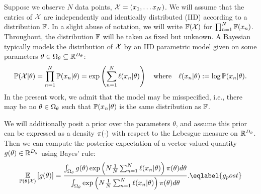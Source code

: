 Suppose we observe $N$ data points, ${\mathcal{X}} = (x_1, \ldots x_N)$.  We will
assume that the entries of ${\mathcal{X}}$ are independently and identically distributed
(IID) according to a distribution $\mathbb{F}$.  In a slight abuse of notation, we
will write $\mathbb{F}({\mathcal{X}})$ for $\prod_{n=1}^N \mathbb{F}(x_n)$.  Throughout, the
distribution $\mathbb{F}$ will be taken as fixed but unknown.  A Bayesian typically
models the distribution of ${\mathcal{X}}$ by an IID parametric model
given on some parameters $\theta \in \Omega_\theta \subseteq \mathbb{R}^{D_\theta}$:
%
$$
\mathbb{P}({\mathcal{X}} \vert \theta) = \prod_{n=1}^N \mathbb{P}(x_n \vert \theta) = 
    \exp\left(\sum_{n=1}^N \ell(x_n \vert \theta) \right)
\quad\textrm{where}\quad
\ell(x_n \vert \theta) := \log \mathbb{P}(x_n \vert \theta).
$$
%
In the present work, we admit that the model may be misspecified, i.e., there may be no $\theta
\in \Omega_\theta$ such that $\mathbb{P}(x_n \vert \theta)$ is the same distribution as
$\mathbb{F}$.  

We will additionally posit a prior over the parameters
$\theta$, and assume this prior can be expressed as
a density $\pi(\cdot)$ with respect to the Lebesgue measure on $\mathbb{R}^{D_\theta}$.  Then
we can compute the posterior expectation of a vector-valued quantity $g(\theta)
\in \mathbb{R}^{D_g}$ using Bayes' rule:
%
\begin{align}
%
\expect{\post}{\g(\theta)} =
    \frac{
    \int_{\thetadom} g(\theta)
        \exp\left(N \meann \ell(\x_n \vert \theta) \right) \prior(\theta)
                        d\theta}
         {\int_{\thetadom}
         \exp\left(N \meann \ell(\x_n \vert \theta) \right) \prior(\theta)
         d\theta}.
         \eqlabel{g_post}
%
\end{align}

